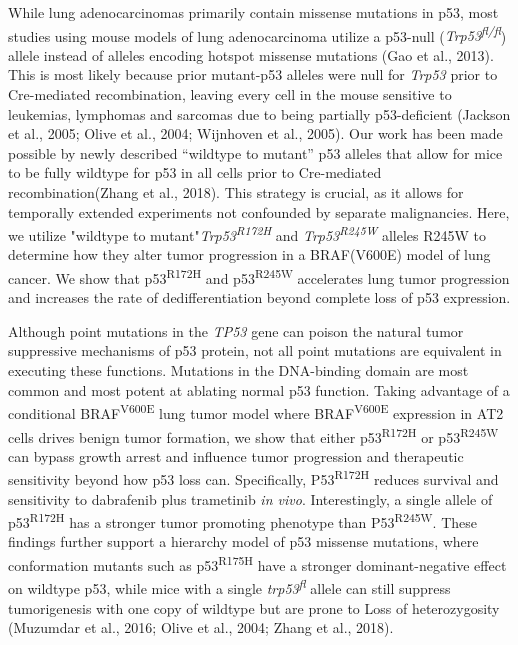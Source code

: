 While lung adenocarcinomas primarily contain missense mutations in p53, most studies using mouse models of lung adenocarcinoma utilize a p53-null (\emph{Trp53\textsuperscript{fl/fl}}) allele instead of alleles encoding hotspot missense mutations (Gao et al., 2013). This is most likely because prior mutant-p53 alleles were null for \emph{Trp53} prior to Cre-mediated recombination, leaving every cell in the mouse sensitive to leukemias, lymphomas and sarcomas due to being partially p53-deficient (Jackson et al., 2005; Olive et al., 2004; Wijnhoven et al., 2005). Our work has been made possible by newly described ``wildtype to mutant'' p53 alleles that allow for mice to be fully wildtype for p53 in all cells prior to Cre-mediated recombination(Zhang et al., 2018). This strategy is crucial, as it allows for temporally extended experiments not confounded by separate malignancies. Here, we utilize "wildtype to mutant"\emph{Trp53\textsuperscript{R172H}} and \emph{Trp53\textsuperscript{R245W}} alleles R245W to determine how they alter tumor progression in a BRAF(V600E) model of lung cancer. We show that p53\textsuperscript{R172H} and p53\textsuperscript{R245W} accelerates lung tumor progression and increases the rate of dedifferentiation beyond complete loss of p53 expression.

Although point mutations in the \emph{TP53} gene can poison the natural tumor suppressive mechanisms of p53 protein, not all point mutations are equivalent in executing these functions. Mutations in the DNA-binding domain are most common and most potent at ablating normal p53 function. Taking advantage of a conditional BRAF\textsuperscript{V600E} lung tumor model where BRAF\textsuperscript{V600E} expression in AT2 cells drives benign tumor formation, we show that either p53\textsuperscript{R172H} or p53\textsuperscript{R245W} can bypass growth arrest and influence tumor progression and therapeutic sensitivity beyond how p53 loss can. Specifically, P53\textsuperscript{R172H} reduces survival and sensitivity to dabrafenib plus trametinib \emph{in vivo}. Interestingly, a single allele of p53\textsuperscript{R172H} has a stronger tumor promoting phenotype than P53\textsuperscript{R245W}. These findings further support a hierarchy model of p53 missense mutations, where conformation mutants such as p53\textsuperscript{R175H} have a stronger dominant-negative effect on wildtype p53, while mice with a single \emph{trp53\textsuperscript{fl}} allele can still suppress tumorigenesis with one copy of wildtype but are prone to Loss of heterozygosity (Muzumdar et al., 2016; Olive et al., 2004; Zhang et al., 2018).

